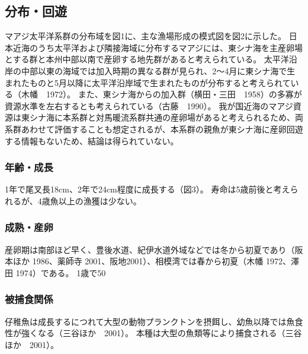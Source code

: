 \subsection{分布・回遊} 
マアジ太平洋系群の分布域を図1に、主な漁場形成の模式図を図2に示した。
日本近海のうち太平洋および隣接海域に分布するマアジには、東シナ海を主産卵場とする群と本州中部以南で産卵する地先群があると考えられている。
太平洋沿岸の中部以東の海域では加入時期の異なる群が見られ、2～4月に東シナ海で生まれたものと5月以降に太平洋沿岸域で生まれたものが分布すると考えられている（木幡　1972）。
また、東シナ海からの加入群（横田・三田　1958）の多寡が資源水準を左右するとも考えられている（古藤　1990）。
我が国近海のマアジ資源は東シナ海に本系群と対馬暖流系群共通の産卵場があると考えられるため、両系群あわせて評価することも想定されるが、本系群の親魚が東シナ海に産卵回遊する情報もないため、結論は得られていない。

\subsubsection{年齢・成長}
1年で尾叉長18cm、2年で24cm程度に成長する（図3）。
寿命は5歳前後と考えられるが、4歳魚以上の漁獲は少ない。

\subsubsection{成熟・産卵}
産卵期は南部ほど早く、豊後水道、紀伊水道外域などでは冬から初夏であり（阪本ほか 1986、薬師寺 2001、阪地2001）、相模湾では春から初夏（木幡 1972、澤田 1974）である。
1歳で50%

\subsubsection{被捕食関係}
仔稚魚は成長するにつれて大型の動物プランクトンを摂餌し、幼魚以降では魚食性が強くなる（三谷ほか　2001）。
本種は大型の魚類等により捕食される（三谷ほか　2001）。
